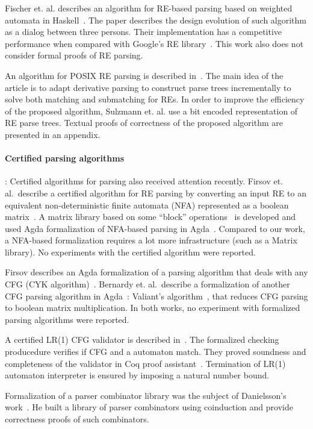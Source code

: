 \documentclass{llncs}
\begin{document}
Fischer et. al. describes an algorithm for RE-based parsing based on
weighted automata in Haskell~\cite{Fischer2010}.  The paper describes
the design evolution of such algorithm as a dialog between three
persons. Their implementation has a competitive performance when
compared with Google's RE library~\cite{re2}. This work also does not
consider formal proofs of RE parsing.

An algorithm for POSIX RE parsing is described
in~\cite{SulzmannL14}. The main idea of the article is to adapt
derivative parsing to construct parse trees incrementally to solve
both matching and submatching for REs. In order to improve the
efficiency of the proposed algorithm, Sulzmann et. al. use a bit
encoded representation of RE parse trees. Textual proofs of
correctness of the proposed algorithm are presented in an appendix.

\paragraph{Certified parsing algorithms}: Certified algorithms for
parsing also received attention recently. Firsov et. al.~describe a
certified algorithm for RE parsing by converting an input RE to an
equivalent non-deterministic finite automata (NFA) represented as a
boolean matrix~\cite{FirsovU13}. A matrix library based on some
``block'' operations~\cite{MacedoO13} is developed and used Agda
formalization of NFA-based parsing in Agda~\cite{Norell2009}. Compared
to our work, a NFA-based formalization requires a lot more
infrastructure (such as a Matrix library). No experiments with the
certified algorithm were reported.

Firsov describes an Agda formalization of a parsing algorithm that
deals with any CFG (CYK algorithm)~\cite{Firsov2014}. Bernardy
et. al.~describe a formalization of another CFG parsing algorithm in
Agda~\cite{BernardyJ16}: Valiant's algorithm~\cite{Valiant1975}, that
reduces CFG parsing to boolean matrix multiplication. In both works,
no experiment with formalized parsing algorithms were reported.

A certified LR(1) CFG validator is described
in~\cite{Jourdan2012}. The formalized checking producedure 
verifies if CFG and a automaton match. They proved soundness and
completeness of the validator in Coq proof
assistant~\cite{Bertot2010}. Termination of LR(1) automaton
interpreter is ensured by imposing a natural number bound.

Formalization of a parser combinator library was the subject of
Danielsson's work~\cite{Danielsson2010}. He built a library of parser
combinators using coinduction and provide correctness proofs of such
combinators.
\end{document}

